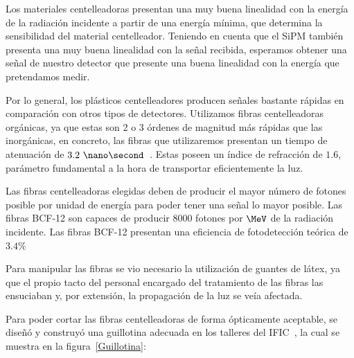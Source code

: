 Los materiales centelleadoras presentan una muy buena linealidad con la energía de la radiación incidente a partir de una energía mínima, que determina la sensibilidad del material centelleador. Teniendo en cuenta que el SiPM también presenta una muy buena linealidad con la señal recibida, esperamos obtener una señal de nuestro detector que presente una buena linealidad con la energía que pretendamos medir.

Por lo general, los plásticos centelleadores producen señales bastante rápidas en comparación con otros tipos de detectores. Utilizamos fibras centelleadoras orgánicas, ya que estas son 2 o 3 órdenes de magnitud más rápidas que las inorgánicas,  en concreto, las fibras que utilizaremos presentan un tiempo de atenuación de $3.2~\nano\second$~\cite{datasheet}. Estas poseen un índice de refracción de $1.6$, parámetro fundamental a la hora de transportar eficientemente la luz.

Las fibras centelleadoras elegidas deben de producir el mayor número de fotones  posible por unidad de energía para poder tener una señal lo mayor posible. Las fibras BCF-12 son capaces de producir $8000$ fotones por $\MeV$ de la radiación incidente. Las fibras BCF-12 presentan una eficiencia de fotodetección teórica de $3.4\%$~\cite{datasheet}

Para manipular las fibras se vio necesario la utilización de guantes de látex, ya que el propio tacto  del personal encargado del tratamiento de las fibras las ensuciaban y, por extensión, la propagación de la luz se veía afectada.

Para poder cortar las fibras centelleadoras de forma ópticamente aceptable, se diseñó y construyó una guillotina adecuada en los talleres del IFIC~\cite{Alberto,anguloytiempo, dependencias, tesisfibras}, la cual se muestra en la figura~\ref{Guillotina}:

